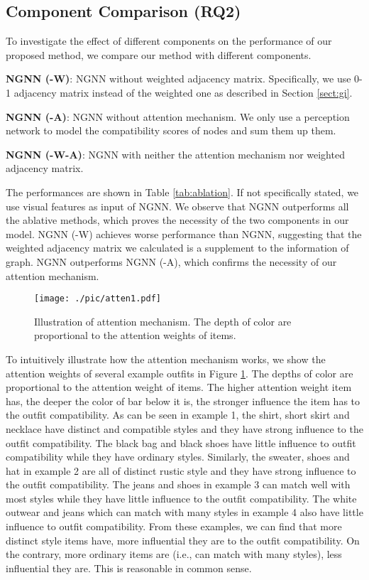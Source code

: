 \documentclass[sigconf]{acmart}
\begin{document}
\subsection{Component Comparison (RQ2)}



To investigate the effect of different components on the performance of our proposed method, we compare our method with different components.

\noindent\textbf{NGNN (-W)}:
NGNN without weighted adjacency matrix. Specifically, we use 0-1 adjacency matrix instead of the weighted one as described in Section \ref{sect:gi}.

\noindent\textbf{NGNN (-A)}: NGNN without attention mechanism. We only use a perception network to model the compatibility scores of nodes and sum them up them.

\noindent\textbf{NGNN (-W-A)}: NGNN with neither the attention mechanism nor weighted adjacency matrix.

The performances are shown in Table \ref{tab:ablation}. If not specifically stated, we use visual features as input of NGNN. We observe that NGNN outperforms all the ablative methods, which proves the necessity of the two components in our model.
NGNN (-W) achieves worse performance than NGNN, suggesting that the weighted adjacency matrix we calculated is a supplement to the information of graph. NGNN outperforms NGNN (-A), which confirms the necessity of our attention mechanism.

\begin{figure}[htbp]

  \centering
\texttt{[image: ./pic/atten1.pdf]}

  \caption{Illustration of attention mechanism. The depth of color are proportional to the attention weights of items.}\label{fig:atten}

\end{figure}

To intuitively illustrate how the attention mechanism works, we show the attention weights of several example outfits in Figure \ref{fig:atten}. The depths of color are proportional to the attention weight of items. The higher attention weight item has, the deeper the color of bar below it is, the stronger influence the item has to the outfit compatibility.
As can be seen in example 1, the shirt, short skirt and necklace have distinct and compatible styles and they have strong influence to the outfit compatibility. The black bag and black shoes have little influence to outfit compatibility while they have ordinary styles. Similarly, the sweater, shoes and hat in example 2 are all of distinct rustic style and they have strong influence to the outfit compatibility. The jeans and shoes in example 3 can match well with most styles while they have little influence to the outfit compatibility. The white outwear and jeans which can match with many styles in example 4 also have little influence to outfit compatibility.
From these examples, we can find that more distinct style items have, more influential they are to the outfit compatibility. On the contrary, more ordinary items are (i.e., can match with many styles), less influential they are. This is reasonable in common sense. 
\end{document}
